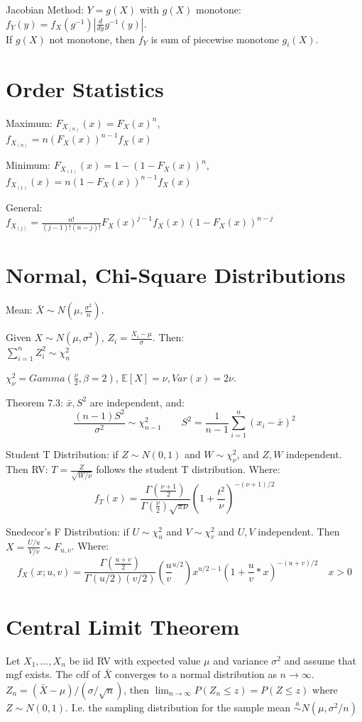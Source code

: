 \documentclass[10pt]{article}
\begin{document}
Jacobian Method: $Y = g(X)$ with $g(X)$ monotone:\\
$f_Y(y) = f_X(g^{-1}) \left| \frac{d}{dy} g^{-1}(y) \right|$.\\
If $g(X)$ not monotone, then $f_Y$ is sum of piecewise monotone $g_i(X)$.

\section{Order Statistics}
Maximum:
$F_{X_{(n)}}(x) = F_X(x) ^n$, \\ 
$f_{X_{(n)}} = n (F_X(x))^{n-1}f_X(x)$ 

Minimum:
$F_{X_{(1)}}(x) = 1 - (1 - F_X(x))^n$, \\
$f_{X_{(1)}}(x) = n (1 - F_X(x)) ^ {n-1} f_X(x)$

General:\\
$f_{X_{(j)}} = \frac{n!}{(j-1)!(n-j)!}F_X(x)^{j-1}f_X(x)(1-F_X(x))^{n-j}$


\section{Normal, Chi-Square Distributions}
Mean: $\bar{X} \sim N(\mu, \frac{\sigma^2}{n})$.

Given $X \sim N(\mu, \sigma^2)$, $Z_i = \frac{X_i - \mu}{\sigma}$. Then:\\
$\sum_{i=1}^n Z_i^2 \sim \chi^2_n$

$\chi^2_\nu = Gamma(\frac{\nu}{2}, \beta=2)$, $\mathbb{E}[X] = \nu, Var(x) = 2\nu$.

Theorem 7.3: $\bar{x}, S^2$ are independent, and:
$$\frac{(n - 1)S^2}{\sigma^2} \sim \chi^2_{n-1} \quad \quad S^2 = \frac{1}{n-1} \sum_{i=1}^n (x_i - \bar{x})^2$$

Student T Distribution: if $Z \sim N(0, 1)$ and $W \sim \chi^2_\nu$, and $Z, W$ independent. Then RV:
$T = \frac{Z}{\sqrt{W / \nu}}$ follows the student T distribution. Where:\\
$$f_T(x) = \frac{\Gamma(\frac{\nu + 1}{2})}{\Gamma(\frac{\nu}{2}) \sqrt{\pi \nu}}(1 + \frac{t^2}{\nu})^{-(\nu + 1)/2}$$


Snedecor's F Distribution: if $U \sim \chi^2 _u$ and $V \sim \chi^2 _v$ and $U,V$ independent.
Then $X = \frac{U / u}{V / v} \sim F_{u,v}$. Where:
$$f_X(x; u, v) = \frac{\Gamma(\frac{u + v}{2})}{\Gamma(u/2)(v/2)} (\frac{u}{v}^{u/2}) x^{u/2 - 1} (1 + \frac{u}{v} * x)^{-(u + v)/2} \quad x > 0$$

\section{Central Limit Theorem}
Let $X_1, \dots, X_n$ be iid RV with expected value $\mu$ and variance $\sigma^2$ and assume that mgf exists.
The cdf of $\bar{X}$ converges to a normal distribution as $n \to \infty$. 
$Z_n = (\bar{X} - \mu)/(\sigma / \sqrt{n})$, then $\lim_{n \to \infty} P(Z_n \leq z) = P(Z \leq z)$ where $Z \sim N(0,1)$.
I.e. the sampling distribution for the sample mean $\overset{a}{\sim} N(\mu, \sigma^2/n)$
\end{document}

